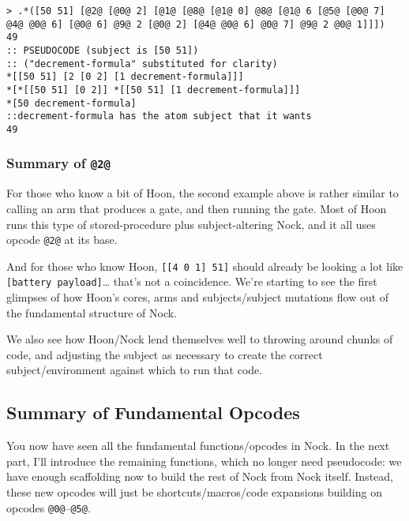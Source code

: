 \documentclass[twoside]{article}
\begin{document}
\begin{lstlisting}[style=listingcode]
> .*([50 51] [@2@ [@0@ 2] [@1@ [@8@ [@1@ 0] @8@ [@1@ 6 [@5@ [@0@ 7] @4@ @0@ 6] [@0@ 6] @9@ 2 [@0@ 2] [@4@ @0@ 6] @0@ 7] @9@ 2 @0@ 1]]])
49
:: PSEUDOCODE (subject is [50 51])
:: ("decrement-formula" substituted for clarity)
*[[50 51] [2 [0 2] [1 decrement-formula]]]
*[*[[50 51] [0 2]] *[[50 51] [1 decrement-formula]]]
*[50 decrement-formula]
::decrement-formula has the atom subject that it wants
49
\end{lstlisting}

\subsubsection{Summary of \lstinline[style=inlinecode]{@2@}}

For those who know a bit of Hoon, the second example above is rather similar to calling an arm that produces a gate, and then running the gate. Most of Hoon runs this type of stored-procedure plus subject-altering Nock, and it all uses opcode \lstinline[style=inlinecode]{@2@} at its base.

And for those who know Hoon, \lstinline[style=inlinecode]{[[4 0 1] 51]} should already be looking a lot like \lstinline[style=inlinecode]{[battery payload]}\dots{} that's not a coincidence.  We're starting to see the first glimpses of how Hoon's cores, arms and subjects/subject mutations flow out of the fundamental structure of Nock.

We also see how Hoon/Nock lend themselves well to throwing around chunks of code, and adjusting the subject as necessary to create the correct subject/environment against which to run that code.

\subsection{Summary of Fundamental Opcodes}

You now have seen all the fundamental functions/opcodes in Nock. In the next part, I'll introduce the remaining functions, which no longer need pseudocode: we have enough scaffolding now to build the rest of Nock from Nock itself. Instead, these new opcodes will just be shortcuts/macros/code expansions building on opcodes \lstinline[style=inlinecode]{@0@}--\lstinline[style=inlinecode]{@5@}.

\end{document}
